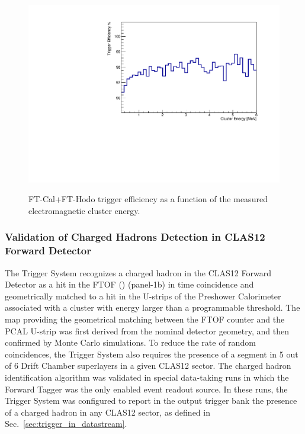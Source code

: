 \begin{figure}[!htb]
 \centering
{\includegraphics[width=.5\textwidth]{img/FT_ClusterEfficiencyHODO.pdf}}
 \caption{FT-Cal+FT-Hodo trigger efficiency as a function of the measured electromagnetic cluster energy.}
 \label{fig:FT_ClusterEfficiencyHODO}
\end{figure}

\subsubsection{Validation of Charged Hadrons Detection in CLAS12 Forward Detector}
\label{valid_hadron_forward_detector}

The Trigger System recognizes a charged hadron in the CLAS12 Forward Detector as a hit in the FTOF (\cite{ftof-ref}) (panel-1b) in time coincidence and geometrically matched to a hit in the U-strips of the Preshower Calorimeter \cite{ec-ref} associated with a cluster with energy larger than a programmable threshold. The map providing the geometrical matching between the FTOF counter and the PCAL U-strip was first derived from the nominal detector geometry, and then confirmed by Monte Carlo simulations. To reduce the rate of random coincidences, the Trigger System also requires the presence of a segment in 5 out of 6 Drift Chamber superlayers in a given CLAS12 sector. The charged hadron identification algorithm was validated in special data-taking runs in which the Forward Tagger was the only enabled event readout source. In these runs, the Trigger System was configured to report in the output trigger bank the presence of a charged hadron in any CLAS12 sector, as defined in Sec.~\ref{sec:trigger_in_datastream}. 

